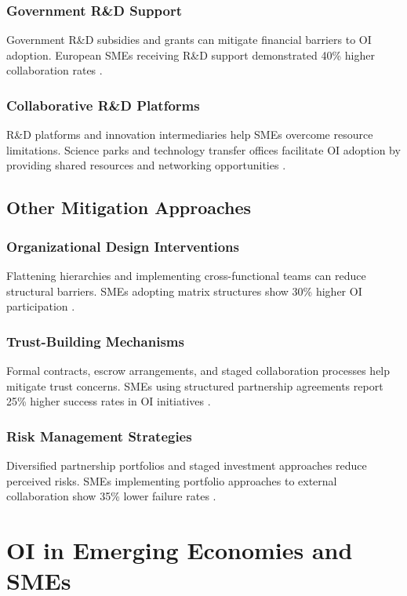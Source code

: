 \subsubsection{Government R\&D Support}
Government R\&D subsidies and grants can mitigate financial barriers to OI adoption. European SMEs receiving R\&D support demonstrated 40\% higher collaboration rates \citep{cerulli2014impact}.

\subsubsection{Collaborative R\&D Platforms}
R\&D platforms and innovation intermediaries help SMEs overcome resource limitations. Science parks and technology transfer offices facilitate OI adoption by providing shared resources and networking opportunities \citep{ziegler2013science}.

\subsection{Other Mitigation Approaches}

\subsubsection{Organizational Design Interventions}
Flattening hierarchies and implementing cross-functional teams can reduce structural barriers. SMEs adopting matrix structures show 30\% higher OI participation \citep{galbraith1971matrix}.

\subsubsection{Trust-Building Mechanisms}
Formal contracts, escrow arrangements, and staged collaboration processes help mitigate trust concerns. SMEs using structured partnership agreements report 25\% higher success rates in OI initiatives \citep{kale2009alliance}.

\subsubsection{Risk Management Strategies}
Diversified partnership portfolios and staged investment approaches reduce perceived risks. SMEs implementing portfolio approaches to external collaboration show 35\% lower failure rates \citep{vanhaverbeke2014open}.

\section{OI in Emerging Economies and SMEs}

